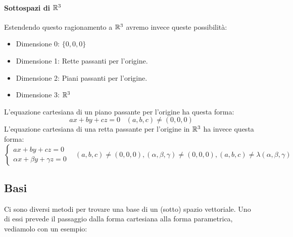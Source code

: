 \paragraph{Sottospazi di $\mathbb{R}^3$}
Estendendo questo ragionamento a $\mathbb{R}^3$ avremo invece queste possibilità:
\begin{itemize}
    \item Dimensione 0: $\{0,0,0\}$
    \item Dimensione 1: Rette passanti per l'origine.
    \item Dimensione 2: Piani passanti per l'origine.
    \item Dimensione 3: $\mathbb{R}^3$
\end{itemize}
L'equazione cartesiana di un piano passante per l'origine ha questa forma:
\[ ax + by +cz = 0 \;\;\; (a,b,c) \neq (0,0,0)\]
L'equazione cartesiana di una retta passante per l'origine in $\mathbb{R}^3$ ha invece questa forma:
\[ \begin{cases}
    ax + by +cz = 0 \\
    \alpha x + \beta y +\gamma z = 0
\end{cases}
\;\;\; (a,b,c) \neq (0,0,0), (\alpha,\beta,\gamma ) \neq (0,0,0), (a,b,c) \neq \lambda(\alpha,\beta,\gamma)
\]

\subsection{Basi}
Ci sono diversi metodi per trovare una base di un (sotto) spazio vettoriale.
Uno di essi prevede il passaggio dalla forma cartesiana alla forma parametrica, vediamolo con un esempio:
